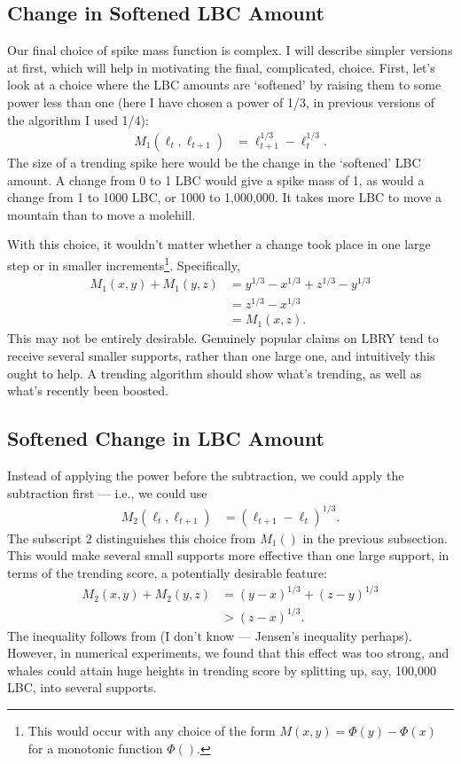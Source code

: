 \documentclass[a4paper, 12pt]{article}
\begin{document}
\subsection{Change in Softened LBC Amount}
Our final choice of spike mass function is complex. I will describe simpler
versions at first, which will help in motivating the final, complicated, choice.
First, let's look at a choice where the LBC amounts are `softened' by raising
them to some power less than one (here I have chosen a power of 1/3, in
previous versions of the algorithm I used 1/4):
\begin{align}
M_1(\ell_t, \ell_{t+1}) &= \ell_{t+1}^{1/3} - \ell_t^{1/3}.
\end{align}
The size of a trending spike here would be the change in the `softened'
LBC amount. A change from 0 to 1 LBC would give a spike mass of 1,
as would a change from 1 to 1000 LBC, or 1000 to 1,000,000. It takes more
LBC to move a mountain than to move a molehill.

With this choice, it wouldn't matter whether a change took place in one large
step or in smaller increments\footnote{This would occur with any
choice of the form $M(x, y) = \Phi(y) - \Phi(x)$ for a monotonic function
$\Phi()$.}. Specifically,
\begin{align}
M_1(x, y) + M_1(y, z)
    &= y^{1/3} - x^{1/3} + z^{1/3} - y^{1/3} \\
    &= z^{1/3} - x^{1/3} \\
    &= M_1(x, z).
\end{align}
This may not be entirely desirable. Genuinely popular claims on LBRY tend
to receive several smaller supports, rather than one large one, and intuitively
this ought to help. A trending algorithm should show what's trending,
as well as what's recently been boosted.


\subsection{Softened Change in LBC Amount}
Instead of applying the power before the subtraction, we could apply the
subtraction first --- i.e., we could use
\begin{align}
M_2(\ell_t, \ell_{t+1}) &= \left(\ell_{t+1} - \ell_t\right)^{1/3}.
\end{align}
The subscript 2 distinguishes this choice from $M_1()$ in the previous
subsection.
This would make several small supports more effective than one large support,
in terms of the trending score, a potentially desirable feature:
\begin{align}
M_2(x, y) + M_2(y, z)
    &= (y - x)^{1/3} + (z - y)^{1/3} \\
    &> (z - x)^{1/3}.
\end{align}
The inequality follows from (I don't know --- Jensen's inequality perhaps).
However, in numerical experiments, we found that this effect was too strong,
and whales could attain huge heights in trending score by splitting up, say,
100,000 LBC, into several supports.
\end{document}
